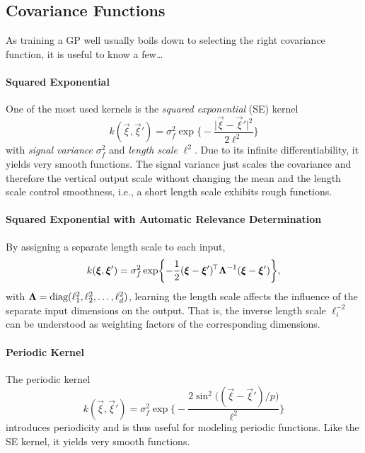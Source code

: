 		\subsection{Covariance Functions}
			As training a GP well usually boils down to selecting the right covariance function, it is useful to know a few\dots

			\paragraph{Squared Exponential}
				One of the most used kernels is the \emph{squared exponential} (SE) kernel
				\begin{equation}
					k(\vec{\xi}, \vec{\xi}') = \sigma_f^2 \exp\biggl\{ -\frac{\lvert \vec{\xi} - \vec{\xi}' \rvert^2}{2 \ell^2} \biggr\}
				\end{equation}
				with \emph{signal variance} \( \sigma_f^2 \) and \emph{length scale} \( \ell^2 \). Due to its infinite differentiability, it yields very smooth functions. The signal variance just scales the covariance and therefore the vertical output scale without changing the mean and the length scale control smoothness, i.e., a short length scale exhibits rough functions.

			\paragraph{Squared Exponential with Automatic Relevance Determination}
				By assigning a separate length scale to each input,
				\begin{equation}
					k(\bm{\xi}, \bm{\xi}') = \sigma_f^2 \exp\biggl\{ -\frac{1}{2} (\bm{\xi} - \bm{\xi}')^{\!\top} \bm{\mathrm{\Lambda}}^{-1} (\bm{\xi} - \bm{\xi}') \biggr\},
				\end{equation}
				with \( \bm{\mathrm{\Lambda}} = \operatorname{diag}(\ell_1^2, \ell_2^2, \dots, \ell_d^2) \), learning the length scale affects the influence of the separate input dimensions on the output. That is, the inverse length scale \( \ell_i^{-2} \) can be understood as weighting factors of the corresponding dimensions.

			\paragraph{Periodic Kernel}
				The periodic kernel
				\begin{equation}
					k(\vec{\xi}, \vec{\xi}') = \sigma_f^2 \exp\biggl\{ -\frac{2 \sin^2\bigl( (\vec{\xi} - \vec{\xi}') / p \bigr)}{\ell^2} \biggr\}
				\end{equation}
				introduces periodicity and is thus useful for modeling periodic functions. Like the SE kernel, it yields very smooth functions.

